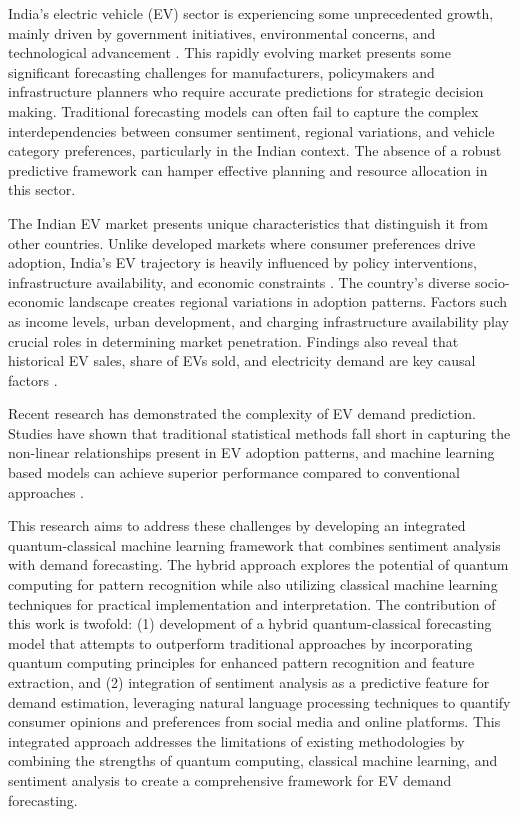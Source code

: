 \documentclass[pdflatex,sn-mathphys-num]{sn-jnl}%
\begin{document}
India's electric vehicle (EV) sector is experiencing some unprecedented growth, mainly driven by government initiatives, environmental concerns, and technological advancement \cite{bib1}. This rapidly evolving market presents some significant forecasting challenges for manufacturers, policymakers and infrastructure planners who require accurate predictions for strategic decision making. Traditional forecasting models can often fail to capture the complex interdependencies between consumer sentiment, regional variations, and vehicle category preferences, particularly in the Indian context. The absence of a robust predictive framework can hamper effective planning and resource allocation in this sector.

The Indian EV market presents unique characteristics that distinguish it from other countries. Unlike developed markets where consumer preferences drive adoption, India's EV trajectory is heavily influenced by policy interventions, infrastructure availability, and economic constraints \cite{bib2}. The country's diverse socio-economic landscape creates regional variations in adoption patterns. Factors such as income levels, urban development, and charging infrastructure availability play crucial roles in determining market penetration. Findings also reveal that historical EV sales, share of EVs sold, and electricity demand are key causal factors \cite{bib3}.

Recent research has demonstrated the complexity of EV demand prediction. Studies have shown that traditional statistical methods fall short in capturing the non-linear relationships present in EV adoption patterns, and machine learning based models can achieve superior performance compared to conventional approaches \cite{bib4}.

This research aims to address these challenges by developing an integrated quantum-classical machine learning framework that combines sentiment analysis with demand forecasting. The hybrid approach explores the potential of quantum computing for pattern recognition while also utilizing classical machine learning techniques for practical implementation and interpretation. The contribution of this work is twofold: (1) development of a hybrid quantum-classical forecasting model that attempts to outperform traditional approaches by incorporating quantum computing principles for enhanced pattern recognition and feature extraction, and (2) integration of sentiment analysis as a predictive feature for demand estimation, leveraging natural language processing techniques to quantify consumer opinions and preferences from social media and online platforms. This integrated approach addresses the limitations of existing methodologies by combining the strengths of quantum computing, classical machine learning, and sentiment analysis to create a comprehensive framework for EV demand forecasting.
\end{document}
